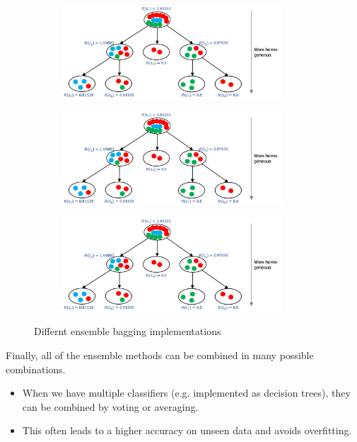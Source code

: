 \begin{figure}[h]
  \centering
  \begin{subfigure}{0.3\textwidth}
    \centering
    \includegraphics[width=0.9\textwidth]{assets/trees/id3/ensemble_instance_bagging.png}
  \end{subfigure}
  \begin{subfigure}{0.3\textwidth}
    \centering
    \includegraphics[width=0.9\textwidth]{assets/trees/id3/ensemble_feature_bagging.png}
  \end{subfigure}
  \begin{subfigure}{0.3\textwidth}
    \centering
    \includegraphics[width=0.9\textwidth]{assets/trees/id3/ensemble_comb_bagging.png}
  \end{subfigure}
  \caption{Differnt ensemble bagging implementations}
  \label{fig:3_bagging}
\end{figure}

Finally, all of the ensemble methods can be combined in many possible combinations. 
\begin{itemize}
  \item When we have multiple classifiers (e.g. implemented as decision trees), they can be combined by voting or averaging.
  \item This often leads to a higher accuracy on unseen data and avoids overfitting.
\end{itemize}
